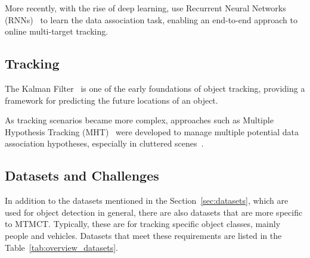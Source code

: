 More recently, with the rise of deep learning, \textcite{Milan16b} use Recurrent Neural Networks (RNNs)~\cite{Rumelhart86} to learn the data association task, enabling an end-to-end approach to online multi-target tracking.

\subsection{Tracking}\label{subsec:milestone_tracking}
The Kalman Filter~\cite{Kalman60} is one of the early foundations of object tracking, providing a framework for predicting the future locations of an object.

As tracking scenarios became more complex, approaches such as Multiple Hypothesis Tracking (MHT)~\cite{Blackman04} were developed to manage multiple potential data association hypotheses, especially in cluttered scenes~\cite{Reid79}.

\subsection{Datasets and Challenges}\label{subsec:datasets_and_challenges}
In addition to the datasets mentioned in the Section~\ref{sec:datasets}, which are used for object detection in general, there are also datasets that are more specific to MTMCT. Typically, these are for tracking specific object classes, mainly people and vehicles. Datasets that meet these requirements are listed in the Table~\ref{tab:overview_datasets}.


